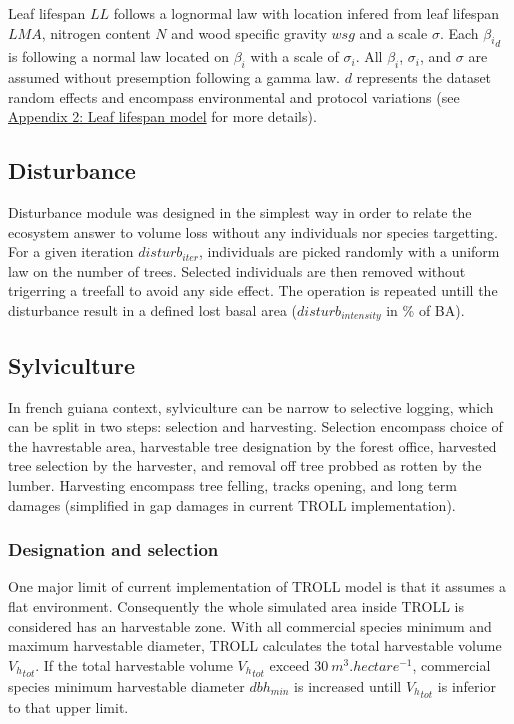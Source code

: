 \documentclass[12pt,]{article}
\theoremstyle{definition}
\theoremstyle{definition}
\theoremstyle{remark}
\begin{document}
Leaf lifespan \(LL\) follows a lognormal law with location infered from
leaf lifespan \(LMA\), nitrogen content \(N\) and wood specific gravity
\(wsg\) and a scale \(\sigma\). Each \({\beta_i}_d\) is following a
normal law located on \(\beta_i\) with a scale of \(\sigma_i\). All
\(\beta_i\), \(\sigma_i\), and \(\sigma\) are assumed without
presemption following a gamma law. \(d\) represents the dataset random
effects and encompass environmental and protocol variations (see
\protect\hyperlink{appendix-2-leaf-lifespan-model}{Appendix 2: Leaf
lifespan model} for more details).

\subsection{Disturbance}\label{disturbance}

Disturbance module was designed in the simplest way in order to relate
the ecosystem answer to volume loss without any individuals nor species
targetting. For a given iteration \(disturb_{iter}\), individuals are
picked randomly with a uniform law on the number of trees. Selected
individuals are then removed without trigerring a treefall to avoid any
side effect. The operation is repeated untill the disturbance result in
a defined lost basal area (\(disturb_{intensity}\) in \% of BA).

\subsection{Sylviculture}\label{sylviculture}

In french guiana context, sylviculture can be narrow to selective
logging, which can be split in two steps: selection and harvesting.
Selection encompass choice of the havrestable area, harvestable tree
designation by the forest office, harvested tree selection by the
harvester, and removal off tree probbed as rotten by the lumber.
Harvesting encompass tree felling, tracks opening, and long term damages
(simplified in gap damages in current TROLL implementation).

\subsubsection{Designation and
selection}\label{designation-and-selection}

One major limit of current implementation of TROLL model is that it
assumes a flat environment. Consequently the whole simulated area inside
TROLL is considered has an harvestable zone. With all commercial species
minimum and maximum harvestable diameter, TROLL calculates the total
harvestable volume \({V_h}_{tot}\). If the total harvestable volume
\({V_h}_{tot}\) exceed \(30~m^3.hectare^{-1}\), commercial species
minimum harvestable diameter \(dbh_{min}\) is increased untill
\({V_h}_{tot}\) is inferior to that upper limit.
\end{document}
